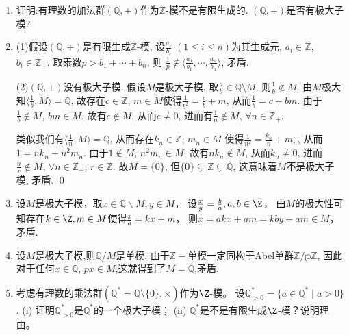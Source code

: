 \begin{enumerate}
    \item[1.5]
        证明:有理数的加法群$(\mathbb Q,+)$作为$\mathbb Z$-模不是有限生成的. 
        $(\mathbb Q,+)$是否有极大子模?

    \item[\textbf{证明:}]
        (1)假设$(\mathbb Q,+)$是有限生成$\mathbb Z$-模, 
        设$\frac{a_i}{b_i}$ $(1\leq i\leq n)$为其生成元, 
        $a_i\in \mathbb Z$, $b_i\in \mathbb Z_+$. 
        取素数$p>b_1+\cdots+b_n$, 则
        $\frac{1}{p}\notin \big\langle \frac{a_1}{b_1},\cdots,\frac{a_n}{b_n}\big\rangle$, 矛盾. \par
        

        (2)$(\mathbb Q,+)$没有极大子模. 假设$M$是极大子模, 
        取$\frac{a}{b}\in \mathbb Q\setminus M$, 则$\frac{1}{b}\notin M$. 
        由$M$极大知$\langle \frac{1}{b},M\rangle=\mathbb Q$, 
        故存在$c\in \mathbb Z$, $m\in M$使得$\frac{1}{b^2}=\frac{c}{b}+m$, 
        从而$\frac{1}{b}=c+bm$. 由于$\frac{1}{b}\notin M$, $bm\in M$, 
        故有$c\notin M$, 从而$c\neq 0$, 进而有$\frac{1}{n}\notin M$, $\forall n\in \mathbb Z_+$. \par
        类似我们有$\langle \frac{1}{n},M\rangle=\mathbb Q$, 
        从而存在$k_n\in \mathbb Z$, $m_n\in M$
        使得$\frac{1}{n^2}=\frac{k_n}{n}+m_n$, 从而$1=nk_n+n^2m_n$. 
        由于$1\notin M$, $n^2m_n\in M$, 故有$nk_n\notin M$, 从而$k_n\neq 0$, 
        进而$\frac{n}{r}\notin M$, $\forall n\in \mathbb Z_+$, $r\in \mathbb Z$. 
        故$M=\{0\}$, 但$\{0\}\subsetneq \mathbb Z\subsetneq \mathbb Q$, 
        这意味着$M$不是极大子模, 矛盾. \qed
    \item[\textbf{另证:}]
        设$M$是极大子模，取$x\in \mathbb Q\backslash M,y\in M$，
        设$\frac{x}{y}=\frac{b}{a},a,b\in\Z$，
        由$M$的极大性可知存在$k\in \Z,m\in M$使得$\frac{x}{a}=kx+m$，
        则$x=akx+am=kby+am\in M$，矛盾.
    \item[\textbf{另证:}]
        设$M$是极大子模,则$\mathbb{Q}/M$是单模.
        由于$\mathbb{Z}-$单模一定同构于Abel单群$\mathbb{Z}/\mathbb{pZ}$,
        因此对于任何$x\in\mathbb{Q}$, $px\in M$,这就得到了$M=\mathbb{Q}$,矛盾.
    
    \item[1.6]
    考虑有理数的乘法群$(\mathbb{Q}^*=\mathbb{Q}\setminus\{0\},\times)$作为$\Z$-模。
    设$\mathbb{Q}_{>0}^*=\{a\in\mathbb{Q}^*\mid a>0\}$. 
    (i) 证明$\mathbb{Q}_{>0}^*$是$\mathbb{Q}^*$的一个极大子模；
    (ii) $\mathbb{Q}^*$是不是有限生成$\Z$-模？说明理由。


\end{enumerate}
